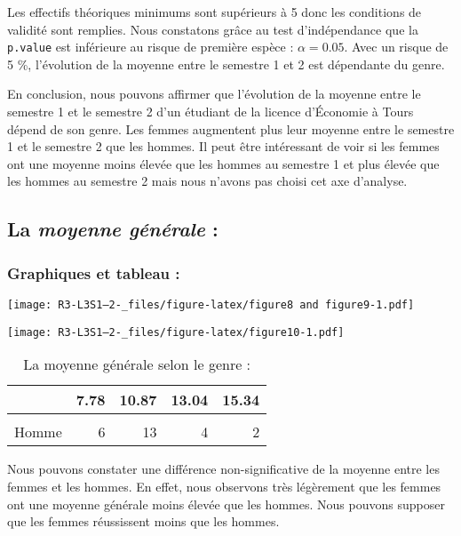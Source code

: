 \documentclass[
  11pt,
  french,
]{article}
\begin{document}
Les effectifs théoriques minimums sont supérieurs à 5 donc les
conditions de validité sont remplies. Nous constatons grâce au test
d'indépendance que la \texttt{p.value} est inférieure au risque de
première espèce : \(\alpha = 0.05\). Avec un risque de 5 \%, l'évolution
de la moyenne entre le semestre 1 et 2 est dépendante du genre.

En conclusion, nous pouvons affirmer que l'évolution de la moyenne entre
le semestre 1 et le semestre 2 d'un étudiant de la licence d'Économie à
Tours dépend de son genre. Les femmes augmentent plus leur moyenne entre
le semestre 1 et le semestre 2 que les hommes. Il peut être intéressant
de voir si les femmes ont une moyenne moins élevée que les hommes au
semestre 1 et plus élevée que les hommes au semestre 2 mais nous n'avons
pas choisi cet axe d'analyse.

\hypertarget{la-moyenne-guxe9nuxe9rale}{%
\subsection{\texorpdfstring{La \emph{moyenne générale}
:}{La moyenne générale :}}\label{la-moyenne-guxe9nuxe9rale}}

\hypertarget{graphiques-et-tableau}{%
\subsubsection{Graphiques et tableau :}\label{graphiques-et-tableau}}

\texttt{[image: R3-L3S1--2-\_files/figure-latex/figure8 and figure9-1.pdf]}

\texttt{[image: R3-L3S1--2-\_files/figure-latex/figure10-1.pdf]}

\begin{table}[!h]

\caption{\label{tab:table7}La moyenne générale selon le genre :}
\centering
\begin{tabular}[t]{lrrrr}
\toprule
  & 7.78 & 10.87 & 13.04 & 15.34\\
\midrule
\cellcolor{gray!6}{Femme} & \cellcolor{gray!6}{10} & \cellcolor{gray!6}{9} & \cellcolor{gray!6}{6} & \cellcolor{gray!6}{2}\\
Homme & 6 & 13 & 4 & 2\\
\bottomrule
\end{tabular}
\end{table}

Nous pouvons constater une différence non-significative de la moyenne
entre les femmes et les hommes. En effet, nous observons très légèrement
que les femmes ont une moyenne générale moins élevée que les hommes.
Nous pouvons supposer que les femmes réussissent moins que les hommes.
\end{document}
